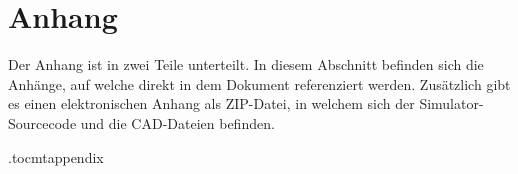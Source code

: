 \documentclass[../main.tex]{subfiles}
\begin{document}
\newpage
\appendix
\chapter*{Anhang}

Der Anhang ist in zwei Teile unterteilt.
In diesem Abschnitt befinden sich die Anhänge, auf welche direkt in dem Dokument referenziert werden.
Zusätzlich gibt es einen elektronischen Anhang als ZIP-Datei, in welchem sich der Simulator-Sourcecode und die CAD-Dateien befinden.

\renewcommand{\thesection}{A\arabic{section}}
\etocdepthtag.toc{mtappendix}
\addtableofcontents






% 
\end{document}
